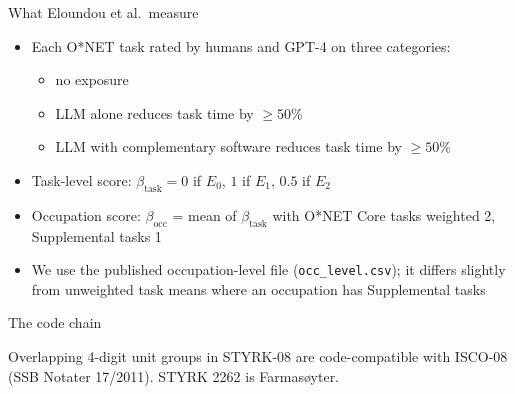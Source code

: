 
\begin{frame}{What Eloundou et al.\ measure}
\begin{itemize}\setlength{\itemsep}{6pt}
  \item Each O*NET task rated by humans and GPT-4 on three categories:
  \begin{itemize}
    \item[$E_0$] no exposure
    \item[$E_1$] LLM alone reduces task time by $\geq 50\%$
    \item[$E_2$] LLM with complementary software reduces task time by $\geq 50\%$
  \end{itemize}
  \item Task-level score:\quad
        $\beta_{\text{task}} = 0$ if $E_0$,\;\; $1$ if $E_1$,\;\; $0.5$ if $E_2$
  \item Occupation score: $\beta_{\text{occ}}$ = mean of $\beta_{\text{task}}$ with O*NET Core tasks weighted 2, Supplemental tasks 1
  \item We use the published occupation-level file (\texttt{occ\_level.csv}); it differs slightly from unweighted task means where an occupation has Supplemental tasks
\end{itemize}
\end{frame}

\begin{frame}{The code chain}
\centering
{}

\vspace{1em}
Overlapping 4-digit unit groups in STYRK-08 are code-compatible with ISCO-08 (SSB Notater 17/2011). STYRK 2262 is Farmasøyter.
\end{frame}

